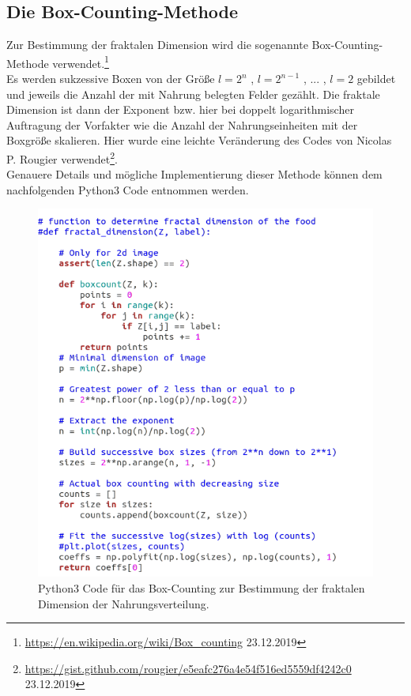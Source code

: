 \documentclass[a4paper, 12pt]{report}
\begin{document}
\subsection{Die Box-Counting-Methode}
Zur Bestimmung der fraktalen Dimension wird die sogenannte Box-Counting-Methode verwendet.\footnote[1]{\url{https://en.wikipedia.org/wiki/Box\_counting} 23.12.2019} 
\\
\noindent Es werden sukzessive Boxen von der Größe $l=2^n$ , $l=2^{n-1}$ , ... , $l=2$ gebildet und jeweils die Anzahl der mit Nahrung belegten Felder gezählt. Die fraktale Dimension ist dann der Exponent bzw. hier bei doppelt logarithmischer Auftragung der Vorfakter wie die Anzahl der Nahrungseinheiten mit der Boxgröße skalieren. Hier wurde eine leichte Veränderung des Codes von Nicolas P. Rougier verwendet\footnote[2]{\url{https://gist.github.com/rougier/e5eafc276a4e54f516ed5559df4242c0} 23.12.2019}.
\\
Genauere Details und mögliche Implementierung dieser Methode können dem nachfolgenden Python3 Code entnommen werden.
\begin{figure}[h!]
	\centering
	\includegraphics[scale=0.8]{fractal.png}
	\caption{Python3 Code für das Box-Counting zur Bestimmung der fraktalen Dimension der Nahrungsverteilung.}
\end{figure}
\end{document}

